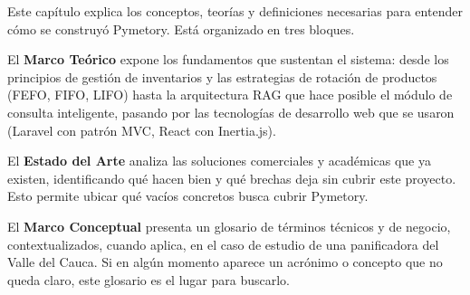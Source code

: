 
Este capítulo explica los conceptos, teorías y definiciones necesarias para entender cómo se construyó Pymetory. Está organizado en tres bloques.

El \textbf{Marco Teórico} expone los fundamentos que sustentan el sistema: desde los principios de gestión de inventarios y las estrategias de rotación de productos (FEFO, FIFO, LIFO) hasta la arquitectura RAG que hace posible el módulo de consulta inteligente, pasando por las tecnologías de desarrollo web que se usaron (Laravel con patrón MVC, React con Inertia.js).

El \textbf{Estado del Arte} analiza las soluciones comerciales y académicas que ya existen, identificando qué hacen bien y qué brechas deja sin cubrir este proyecto. Esto permite ubicar qué vacíos concretos busca cubrir Pymetory.

El \textbf{Marco Conceptual} presenta un glosario de términos técnicos y de negocio, contextualizados, cuando aplica, en el caso de estudio de una panificadora del Valle del Cauca. Si en algún momento aparece un acrónimo o concepto que no queda claro, este glosario es el lugar para buscarlo.
